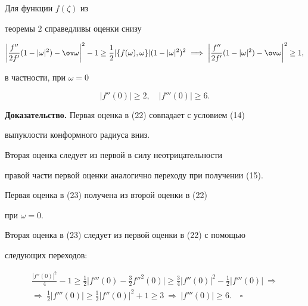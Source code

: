 \begin{thm} 


Для функции $f(\zeta)$ из 


теоремы $2$ справедливы оценки снизу 


\begin{equation} 


\bigg|\frac{f''}{2f'}(1-|\omega|^2)-\ov\omega\bigg|^2-1\ge 


\frac{1}{2}|\{f(\omega),\omega\}|(1-|\omega|^2)^2\  


\Longrightarrow\ \bigg|\frac{f''}{2f'}(1-|\omega|^2)-\ov\omega 


\bigg|^2\ge1, 


\end{equation} 


в частности, при $\omega=0$ 


\begin{equation} 


|f''(0)|\ge2,\quad |f'''(0)|\ge6. 


\end{equation} 


\end{thm} 


 


{\bf Доказательство.} Первая оценка в (22) совпадает с условием (14) 


выпуклости конформного радиуса вниз. 


Вторая оценка следует из первой в силу неотрицательности 


правой части первой оценки аналогично переходу при получении (15). 


 


Первая оценка в (23) получена из второй оценки в (22) 


при $\omega=0$. 


Вторая оценка в (23) следует из первой оценки в (22) с помощью 


следующих переходов:


\begin{multline*} 


\frac{|f''(0)|^2}{4}-1\ge\frac{1}{2}\bigg|f'''(0)- 


\frac{3}{2}{f''}^2(0)\bigg|\ge\frac{3}{4}|f''(0)|^2- 


\frac{1}{2}|f'''(0)|\ \Longrightarrow \\ 


% 


\Longrightarrow\ \frac{1}{2}|f'''(0)|\ge\frac{1}{2} 


|f''(0)|^2+1\ge3\ \Longrightarrow \ |f'''(0)|\ge6. 


\quad\square 


\end{multline*} 



